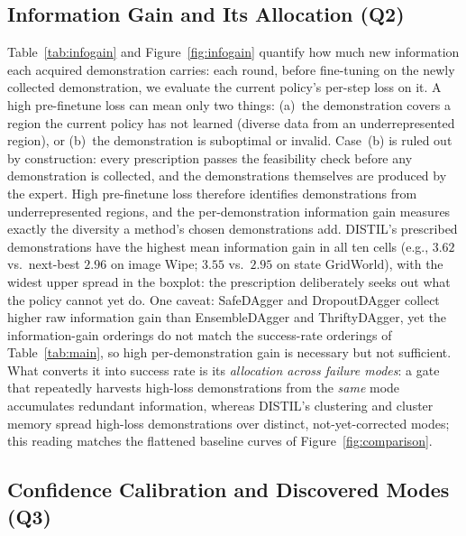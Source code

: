 \documentclass[letterpaper]{article} %
\begin{document}
\subsection{Information Gain and Its Allocation (Q2)}

Table~\ref{tab:infogain} and Figure~\ref{fig:infogain} quantify how much new
information each acquired demonstration carries: each round, before
fine-tuning on the newly collected demonstration, we evaluate the current
policy's per-step loss on it. A high pre-finetune loss can mean only two
things: (a)~the demonstration covers a region the current policy has not
learned (diverse data from an underrepresented region), or (b)~the
demonstration is suboptimal or invalid. Case~(b) is ruled out by
construction: every prescription passes the feasibility check before any
demonstration is collected, and the demonstrations themselves are produced by
the expert. High pre-finetune loss therefore identifies demonstrations from
underrepresented regions, and the per-demonstration information gain measures
exactly the diversity a method's chosen demonstrations add. DISTIL's
prescribed demonstrations have the highest mean information gain in all ten
cells (e.g., $3.62$ vs.\ next-best $2.96$ on image Wipe; $3.55$ vs.\ $2.95$
on state GridWorld), with the widest upper spread in the boxplot: the
prescription deliberately seeks out what the policy cannot yet do. One
caveat: SafeDAgger and DropoutDAgger collect higher raw
information gain than EnsembleDAgger and ThriftyDAgger, yet the
information-gain orderings do not match the success-rate orderings of
Table~\ref{tab:main}, so high per-demonstration gain is necessary but not
sufficient. What converts it into success rate is its \emph{allocation
across failure modes}: a gate that repeatedly harvests high-loss
demonstrations from the \emph{same} mode accumulates redundant information,
whereas DISTIL's clustering and cluster memory spread high-loss
demonstrations over distinct, not-yet-corrected modes; this reading
matches the flattened baseline curves of
Figure~\ref{fig:comparison}.

\subsection{Confidence Calibration and Discovered Modes (Q3)}
\end{document}
